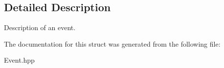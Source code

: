 \subsection{Detailed Description}
Description of an event. 

The documentation for this struct was generated from the following file\+:\begin{DoxyCompactItemize}
\item 
Event.\+hpp\end{DoxyCompactItemize}
